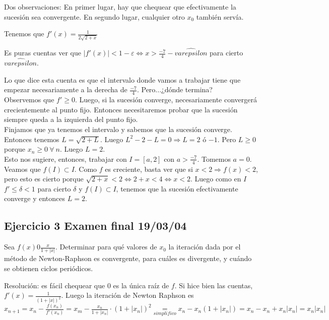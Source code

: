 \documentclass[10pt,a4paper,final]{report}
\begin{document}
{Dos observaciones: En primer lugar, hay que chequear que efectivamente la sucesión sea convergente. En segundo lugar, cualquier otro $x_0$ también servía.

Tenemos que $f'(x) = \frac{1}{2 \sqrt{2+x}}$

Es puras cuentas ver que $|f'(x)|<1 - \varepsilon \Leftrightarrow x > \frac{-7}{4} - \hat{varepsilon}$ para cierto $\hat{varepsilon}$.

Lo que dice esta cuenta es que el intervalo donde vamos a trabajar tiene que empezar necesariamente a la derecha de $\frac{-7}{4}$. Pero...¿dónde termina?\\

Observemos que $f'\geq 0$. Luego, si la sucesión converge, necesariamente convergerá crecientemente al punto fijo. Entonces necesitaremos probar que la sucesión siempre queda a la izquierda del punto fijo.\\

Finjamos que ya tenemos el intervalo y sabemos que la sucesión converge. Entonces tenemos $L = \sqrt{2 + L}$. Luego $L^2 - 2 - L = 0 \Rightarrow L=2$ ó $-1$. Pero $L\geq 0$ porque $x_n \geq 0\ \forall\ n$. Luego $L=2$.\\

Esto nos sugiere, entonces, trabajar con $I = [a,2]$ con $a > \frac{-7}{4}$. Tomemos $a=0$.\\

Veamos que $f(I) \subset I$. Como $f$ es creciente, basta ver que si $x<2 \Rightarrow f(x) < 2$, pero esto es cierto porque $\sqrt{2+x}<2 \Leftrightarrow 2 +x<4 \Leftrightarrow x < 2$. Luego como en $I$ $f' \leq \delta < 1$ para cierto $\delta$ y $f(I) \subset I$, tenemos que la sucesión efectivamente converge y entonces $L=2$.


\subsection{Ejercicio 3 Examen final 19/03/04}

Sea $f(x) 0 \frac{x}{1+|x|}$. Determinar para qué valores de $x_0$ la iteración dada por el método de Newton-Raphson es convergente, para cuáles es divergente, y cuándo se obtienen ciclos periódicos.

Resolución: es fácil chequear que $0$ es la única raíz de $f$. Si hice bien las cuentas, $f'(x) = \frac{1}{(1+|x|)^2}$. Luego la iteración de Newton Raphson es $x_{n+1}=x_n - \frac{f(x_n)}{f'(x_n)} = x_m - \frac{x_n}{1+|x_n|} \cdot (1+|x_n|)^2  \underset{simplifico}{=} x_n - x_n (1+|x_n|) = x_n - x_n + x_n |x_n| = x_n |x_n|$

}
\end{document}

